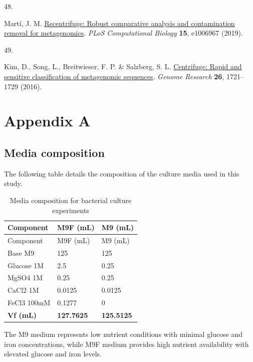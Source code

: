\documentclass[
  11pt,
  a4paper,
]{report}
\newlength{\cslhangindent}
\newlength{\csllabelwidth}
\newenvironment{CSLReferences}[2] %
 {\begin{list}{}{%
  \setlength{\itemindent}{0pt}
  \setlength{\leftmargin}{0pt}
  \setlength{\parsep}{0pt}
  \ifodd #1
   \setlength{\leftmargin}{\cslhangindent}
   \setlength{\itemindent}{-1\cslhangindent}
  \fi
  \setlength{\itemsep}{#2\baselineskip}}}
 {\end{list}}
\newcommand{\CSLLeftMargin}[1]{\parbox[t]{\csllabelwidth}{\strut#1\strut}}
\newcommand{\CSLRightInline}[1]{\parbox[t]{\linewidth - \csllabelwidth}{\strut#1\strut}}
\begin{document}
\begin{CSLReferences}{0}{0}
\CSLLeftMargin{48. }%
\CSLRightInline{Martí, J. M.
\href{https://doi.org/10.1371/journal.pcbi.1006967}{Recentrifuge: Robust
comparative analysis and contamination removal for metagenomics}.
\emph{PLoS Computational Biology} \textbf{15}, e1006967 (2019).}

\CSLLeftMargin{49. }%
\CSLRightInline{Kim, D., Song, L., Breitwieser, F. P. \& Salzberg, S. L.
\href{https://doi.org/10.1101/gr.210641.116}{Centrifuge: Rapid and
sensitive classification of metagenomic sequences}. \emph{Genome
Research} \textbf{26}, 1721--1729 (2016).}

\end{CSLReferences}

\cleardoublepage
{}
{}
\appendix

\chapter{Appendix A}\label{sec-appendix-a}

\section{Media composition}\label{sec-appendix-media}

The following table details the composition of the culture media used in
this study.

\begin{longtable}[]{@{}lll@{}}
\caption{Media composition for bacterial culture
experiments}\label{tbl-media}\tabularnewline
\toprule\noalign{}
Component & M9F (mL) & M9 (mL) \\
\midrule\noalign{}
\endfirsthead
\toprule\noalign{}
Component & M9F (mL) & M9 (mL) \\
\midrule\noalign{}
\endhead
\bottomrule\noalign{}
\endlastfoot
Base M9 & 125 & 125 \\
Glucose 1M & 2.5 & 0.25 \\
MgSO4 1M & 0.25 & 0.25 \\
CaCl2 1M & 0.0125 & 0.0125 \\
FeCl3 100mM & 0.1277 & 0 \\
\textbf{Vf (mL)} & \textbf{127.7625} & \textbf{125.5125} \\
\end{longtable}

The M9 medium represents low nutrient conditions with minimal glucose
and iron concentrations, while M9F medium provides high nutrient
availability with elevated glucose and iron levels.
\end{document}
